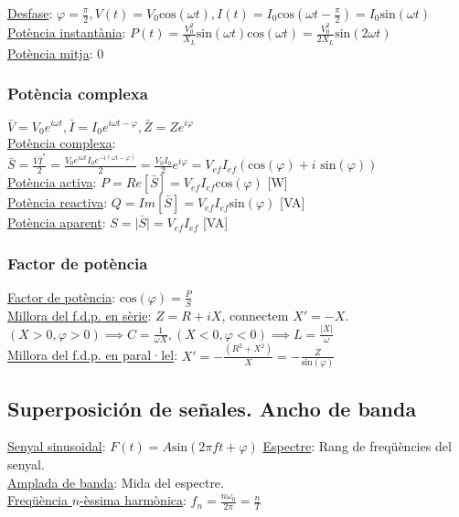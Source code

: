 \documentclass[12pt]{article}
\begin{document}
\begin{multicols}{2}
\underline{Desfase}: $\varphi = \frac{\pi}{2}, V(t) = V_0\text{cos}(\omega t), I(t) = I_0\text{cos}(\omega t - \frac{\pi}{2}) = I_0\text{sin}(\omega t)$ \\
\underline{Potència instantània}: $P(t) = \frac{V_0^2}{X_L}\text{sin}(\omega t)\text{cos}(\omega t) = \frac{V_0^2}{2X_L}\text{sin}(2\omega t)$ \\
\underline{Potència mitja}: 0 \\

\subsubsection*{Potència complexa}

$\bar{V} = V_0e^{i\omega t}, \bar{I} = I_0e^{i\omega t - \varphi}, \bar{Z} = Z e^{i\varphi}$ \\
\underline{Potència complexa}: $\bar{S} = \frac{\bar{V}\bar{I}^*}{2} = \frac{V_0e^{i\omega t}I_0e^{-i(\omega t - \varphi)}}{2} = \frac{V_0I_0}{2}e^{i\varphi} = V_{ef}I_{ef}(\text{cos}(\varphi) + i\text{ sin}(\varphi))$ \\
\underline{Potència activa}: $P = Re[\bar{S}] = V_{ef}I_{ef}\text{cos}(\varphi)$ [W] \\
\underline{Potència reactiva}: $Q = Im[\bar{S}] = V_{ef}I_{ef}\text{sin}(\varphi)$ [VA] \\
\underline{Potència aparent}: $S = \vert \bar{S} \vert = V_{ef}I_{ef}$ [VA] \\

\subsubsection*{Factor de potència}

\underline{Factor de potència}: $\text{cos}(\varphi) = \frac{P}{S}$ \\
\underline{Millora del f.d.p. en sèrie}: $Z = R + iX$, connectem $X' = -X$. $(X>0,\varphi>0) \implies C=\frac{1}{\omega X}, (X<0, \varphi<0) \implies L=\frac{\vert X\vert}{\omega}$ \\
\underline{Millora del f.d.p. en paral·lel}: $X' = -\frac{(R^2+X^2)}{X} = -\frac{Z}{\text{sin}(\varphi)}$ \\

\subsection*{Superposición de señales. Ancho de banda}

\underline{Senyal sinusoidal}: $F(t) = A\text{sin}(2\pi ft+ \varphi)$
\underline{Espectre}: Rang de freqüències del senyal. \\
\underline{Amplada de banda}: Mida del espectre. \\
\underline{Freqüència $n$-èssima harmònica}: $f_n = \frac{n\omega_0}{2\pi} = \frac{n}{T}$ \\


\end{multicols}
\end{document}
